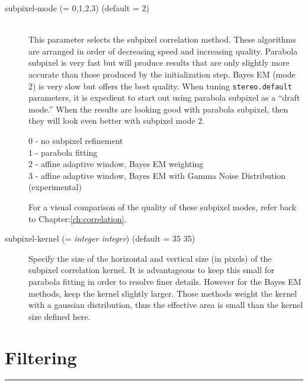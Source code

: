 \begin{description}

\item[subpixel-mode \textnormal{\small{(= 0,1,2,3)}} (default = 2)] \hfill \\
  This parameter selects the subpixel correlation method. These
  algorithms are arranged in order of decreasing speed and increasing
  quality. Parabola subpixel is very fast but will produce results
  that are only slightly more accurate than those produced by the
  initialization step. Bayes EM (mode 2) is very slow but offers the
  best quality. When tuning {\tt stereo.default} parameters, it is
  expedient to start out using parabola subpixel as a ``draft mode.''
  When the results are looking good with parabola subpixel, then they
  will look even better with subpixel mode 2.

  \begin{description}
    \item[0 - no subpixel refinement]
    \item[1 - parabola fitting ]
    \item[2 - affine adaptive window, Bayes EM weighting ]
    \item[3 - affine adaptive window, Bayes EM with Gamma Noise Distribution (experimental) ]
  \end{description}

  For a visual comparison of the quality of these subpixel modes,
  refer back to Chapter:\ref{ch:correlation}.

\item[subpixel-kernel \textnormal{\small{(= \emph{integer integer})}} (default = 35 35)]
  Specify the size of the horizontal and vertical size (in pixels) of
  the subpixel correlation kernel. It is advantageous to keep this
  small for parabola fitting in order to resolve finer
  details. However for the Bayes EM methods, keep the kernel slightly
  larger. Those methods weight the kernel with a gaussian
  distribution, thus the effective area is small than the kernel size
  defined here.

\end{description}


\section{Filtering}
\hrule
\bigskip

